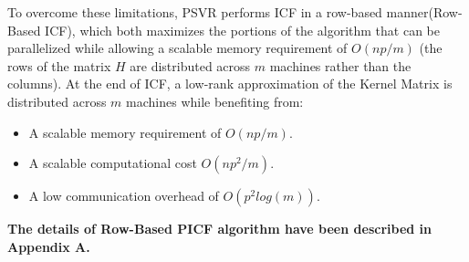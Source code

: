 \documentclass[12pt]{article}
\begin{document}
To overcome these limitations, PSVR performs ICF in a row-based manner(Row-Based ICF), which both maximizes the portions of the algorithm that can be parallelized while allowing a scalable memory requirement of $O(np/m)$ (the rows of the matrix $H$ are distributed across $m$ machines rather than the columns).
\newline\newline
At the end of ICF, a low-rank approximation of the Kernel Matrix is distributed across $m$ machines while benefiting from:
\begin{itemize}
\item A scalable memory requirement of $O(np/m)$.
\item A scalable computational cost $O(np^2/m)$.
\item A low communication overhead of $O(p^2 log(m))$.
\end{itemize} 
{\bf The details of Row-Based PICF algorithm have been described in Appendix A.}
\end{document}
